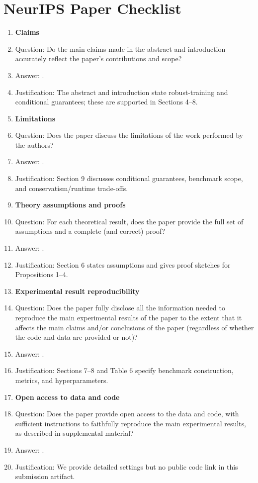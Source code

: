 \section*{NeurIPS Paper Checklist}
\begin{enumerate}
\item {\bf Claims}
\item[] Question: Do the main claims made in the abstract and introduction accurately reflect the paper's contributions and scope?
\item[] Answer: \answerYes{}.
\item[] Justification: The abstract and introduction state robust-training and conditional guarantees; these are supported in Sections 4--8.
\item {\bf Limitations}
\item[] Question: Does the paper discuss the limitations of the work performed by the authors?
\item[] Answer: \answerYes{}.
\item[] Justification: Section 9 discusses conditional guarantees, benchmark scope, and conservatism/runtime trade-offs.
\item {\bf Theory assumptions and proofs}
\item[] Question: For each theoretical result, does the paper provide the full set of assumptions and a complete (and correct) proof?
\item[] Answer: \answerYes{}.
\item[] Justification: Section 6 states assumptions and gives proof sketches for Propositions 1--4.
\item {\bf Experimental result reproducibility}
\item[] Question: Does the paper fully disclose all the information needed to reproduce the main experimental results of the paper to the extent that it affects the main claims and/or conclusions of the paper (regardless of whether the code and data are provided or not)?
\item[] Answer: \answerYes{}.
\item[] Justification: Sections 7--8 and Table 6 specify benchmark construction, metrics, and hyperparameters.
\item {\bf Open access to data and code}
\item[] Question: Does the paper provide open access to the data and code, with sufficient instructions to faithfully reproduce the main experimental results, as described in supplemental material?
\item[] Answer: \answerNo{}.
\item[] Justification: We provide detailed settings but no public code link in this submission artifact.
\end{enumerate}
